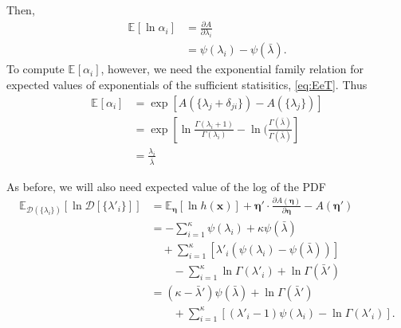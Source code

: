 \documentclass[aps,showpacs,twocolumn,prd,superscriptaddress,nofootinbib]{revtex4}
\newcommand{\nn}{\nonumber}
\newcommand{\E}[1]{{\mathbb E}_{#1}\!}
\begin{document}
Then, 
\begin{align}
\E{}\left[\ln\alpha_i\right] 
&=\frac{\partial A}{\partial\lambda_{i}}\nn\\
&=\psi(\lambda_i)-\psi(\bar\lambda).\label{eq:Elnalpha}
\end{align}
To compute $\E{}\left[\alpha_i\right]$, however, we need the exponential family relation for expected values of exponentials of the sufficient statisitics, \eqref{eq:EeT}. Thus
\begin{align*}
  \E{}\left[\alpha_i\right]
  &=\exp\left[A(\{\lambda_j+\delta_{ji}\})-A(\{\lambda_j\})\right]\\
  &=\exp\left[\ln\frac{\Gamma(\lambda_i+1)}{\Gamma(\lambda_i)}-\ln(\frac{\Gamma(\bar\lambda)}{\Gamma(\bar\lambda)}\right]\\
  &=\frac{\lambda_i}{\bar\lambda}
\end{align*}

As before, we will also need expected value of the log of the PDF
\begin{align}
    \E{\mathcal{D}(\{\lambda_i\})}\left[\ln{\mathcal{D}[\{\lambda'_i\}]}\right]
    &=\E{\bm\eta}\left[\ln{h(\bm x)}\right]+\bm\eta' \cdot \frac{\partial A(\bm\eta)}{\partial\bm\eta} -A({\bm\eta'})\nn\\
    &=-\sum_{i=1}^\kappa\psi(\lambda_i)+\kappa\psi(\bar\lambda)\nn\\
    &\quad+\sum_{i=1}^\kappa\left[\lambda'_i(\psi(\lambda_i)-\psi(\bar\lambda))\right]\nn\\
    &\qquad-\sum_{i=1}^\kappa\ln\Gamma(\lambda'_i)+\ln\Gamma(\bar\lambda')\nn\\
    &=(\kappa-\bar\lambda')\psi(\bar\lambda)+\ln\Gamma(\bar\lambda')\nn\\
    &\qquad+\sum_{i=1}^\kappa\left[(\lambda'_i-1)\psi(\lambda_i)-\ln\Gamma(\lambda'_i)\right].
    \label{eq:ElnD}
\end{align}
\end{document}
